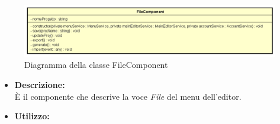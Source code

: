 \begin{figure}[h!]
	\centering
	\includegraphics[scale=0.8]{res/sections/SpecificaFrontEnd/Components/Disegnetti/file.png}
	\caption{Diagramma della classe FileComponent}
\end{figure}

\begin{itemize}
	\item \textbf{Descrizione:}\\
	È il componente che descrive la voce \textit{File} del menu dell'editor.
	\item \textbf{Utilizzo:}\\
	

\end{itemize}
